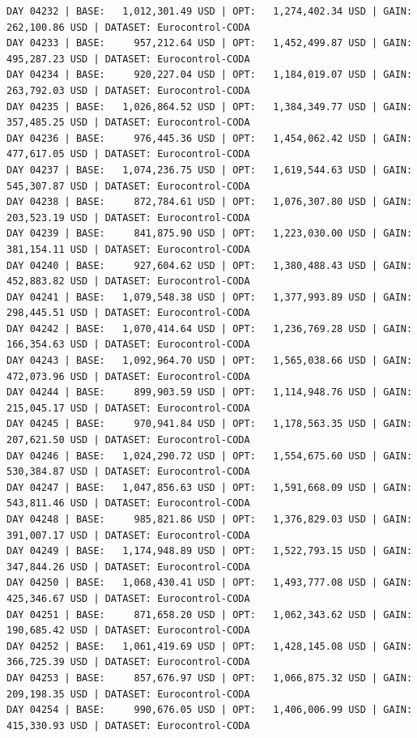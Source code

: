 \documentclass[11pt,a4paper]{article}
\begin{document}
\begin{verbatim}
DAY 04232 | BASE:   1,012,301.49 USD | OPT:   1,274,402.34 USD | GAIN: 262,100.86 USD | DATASET: Eurocontrol-CODA
DAY 04233 | BASE:     957,212.64 USD | OPT:   1,452,499.87 USD | GAIN: 495,287.23 USD | DATASET: Eurocontrol-CODA
DAY 04234 | BASE:     920,227.04 USD | OPT:   1,184,019.07 USD | GAIN: 263,792.03 USD | DATASET: Eurocontrol-CODA
DAY 04235 | BASE:   1,026,864.52 USD | OPT:   1,384,349.77 USD | GAIN: 357,485.25 USD | DATASET: Eurocontrol-CODA
DAY 04236 | BASE:     976,445.36 USD | OPT:   1,454,062.42 USD | GAIN: 477,617.05 USD | DATASET: Eurocontrol-CODA
DAY 04237 | BASE:   1,074,236.75 USD | OPT:   1,619,544.63 USD | GAIN: 545,307.87 USD | DATASET: Eurocontrol-CODA
DAY 04238 | BASE:     872,784.61 USD | OPT:   1,076,307.80 USD | GAIN: 203,523.19 USD | DATASET: Eurocontrol-CODA
DAY 04239 | BASE:     841,875.90 USD | OPT:   1,223,030.00 USD | GAIN: 381,154.11 USD | DATASET: Eurocontrol-CODA
DAY 04240 | BASE:     927,604.62 USD | OPT:   1,380,488.43 USD | GAIN: 452,883.82 USD | DATASET: Eurocontrol-CODA
DAY 04241 | BASE:   1,079,548.38 USD | OPT:   1,377,993.89 USD | GAIN: 298,445.51 USD | DATASET: Eurocontrol-CODA
DAY 04242 | BASE:   1,070,414.64 USD | OPT:   1,236,769.28 USD | GAIN: 166,354.63 USD | DATASET: Eurocontrol-CODA
DAY 04243 | BASE:   1,092,964.70 USD | OPT:   1,565,038.66 USD | GAIN: 472,073.96 USD | DATASET: Eurocontrol-CODA
DAY 04244 | BASE:     899,903.59 USD | OPT:   1,114,948.76 USD | GAIN: 215,045.17 USD | DATASET: Eurocontrol-CODA
DAY 04245 | BASE:     970,941.84 USD | OPT:   1,178,563.35 USD | GAIN: 207,621.50 USD | DATASET: Eurocontrol-CODA
DAY 04246 | BASE:   1,024,290.72 USD | OPT:   1,554,675.60 USD | GAIN: 530,384.87 USD | DATASET: Eurocontrol-CODA
DAY 04247 | BASE:   1,047,856.63 USD | OPT:   1,591,668.09 USD | GAIN: 543,811.46 USD | DATASET: Eurocontrol-CODA
DAY 04248 | BASE:     985,821.86 USD | OPT:   1,376,829.03 USD | GAIN: 391,007.17 USD | DATASET: Eurocontrol-CODA
DAY 04249 | BASE:   1,174,948.89 USD | OPT:   1,522,793.15 USD | GAIN: 347,844.26 USD | DATASET: Eurocontrol-CODA
DAY 04250 | BASE:   1,068,430.41 USD | OPT:   1,493,777.08 USD | GAIN: 425,346.67 USD | DATASET: Eurocontrol-CODA
DAY 04251 | BASE:     871,658.20 USD | OPT:   1,062,343.62 USD | GAIN: 190,685.42 USD | DATASET: Eurocontrol-CODA
DAY 04252 | BASE:   1,061,419.69 USD | OPT:   1,428,145.08 USD | GAIN: 366,725.39 USD | DATASET: Eurocontrol-CODA
DAY 04253 | BASE:     857,676.97 USD | OPT:   1,066,875.32 USD | GAIN: 209,198.35 USD | DATASET: Eurocontrol-CODA
DAY 04254 | BASE:     990,676.05 USD | OPT:   1,406,006.99 USD | GAIN: 415,330.93 USD | DATASET: Eurocontrol-CODA

\end{verbatim}
\end{document}

